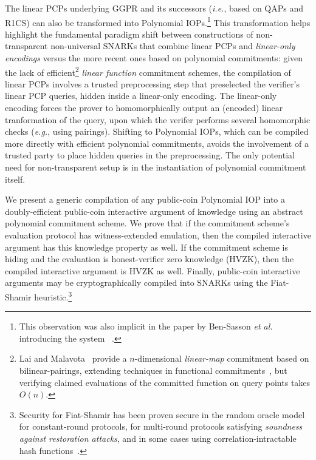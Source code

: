 The linear PCPs underlying GGPR and its successors (\emph{i.e.}, based on QAPs and R1CS) can also be transformed into Polynomial IOPs.\footnote{This observation was also implicit in the paper by Ben-Sasson \emph{et al.} introducing the system ~\cite{EC:BCRSVW19}.} This transformation helps highlight the fundamental paradigm shift between constructions of non-transparent non-universal SNARKs that combine linear PCPs and \emph{linear-only encodings} versus the more recent ones based on polynomial commitments: given the lack of efficient\footnote{Lai and Malavota~\cite{C:LaiMal19} provide a $n$-dimensional \emph{linear-map} commitment based on bilinear-pairings, extending techniques in functional commitments~\cite{ICALP:LibRamYun16}, but verifying claimed evaluations of the committed function on query points takes $O(n)$.} \emph{linear function} commitment schemes, the compilation of linear PCPs involves a trusted preprocessing step that preselected the verifier's linear PCP queries, hidden inside a linear-only encoding. The linear-only encoding forces the prover to homomorphically output an (encoded) linear tranformation of the query, upon which the verifer performs several homomorphic checks (\emph{e.g.}, using pairings).
Shifting to Polynomial IOPs, which can be compiled more directly with efficient polynomial commitments, avoids the involvement of a trusted party to place hidden queries in the preprocessing. The only potential need for non-transparent setup is in the instantiation of polynomial commitment itself.    

We present a generic compilation of any public-coin Polynomial IOP into a doubly-efficient public-coin interactive argument of knowledge using an abstract polynomial commitment scheme. We prove that if the commitment scheme's evaluation protocol has witness-extended emulation, then the compiled interactive argument has this knowledge property as well. If the commitment scheme is hiding and the evaluation is honest-verifier zero knowledge (HVZK), then the compiled interactive argument is HVZK as well. Finally, public-coin interactive arguments may be cryptographically compiled into SNARKs using the Fiat-Shamir heuristic.\footnote{Security for Fiat-Shamir has been proven secure in the random oracle model for constant-round protocols, for multi-round protocols satisfying \emph{soundness against restoration attacks}, and in some cases using correlation-intractable hash functions~\cite{C:FiaSha86,TCC:BenChiSpo16,C:KalRotRot17,EC:CCRR18,STOC:CCHLRRW19}.}

